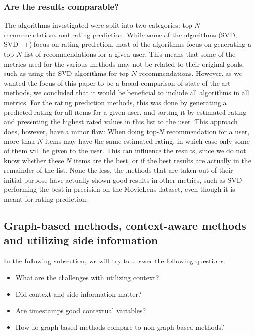 \subsubsection{Are the results comparable?}
The algorithms investigated were split into two categories: top-$N$ recommendations and rating prediction.
While some of the algorithms (SVD, SVD++) focus on rating prediction, most of the algorithms focus on generating a top-$N$ list of recommendations for a given user.
This means that some of the metrics used for the various methods may not be related to their original goals, such as using the SVD algorithms for top-$N$ recommendations.
However, as we wanted the focus of this paper to be a broad comparison of state-of-the-art methods, we concluded that it would be beneficial to include all algorithms in all metrics.
For the rating prediction methods, this was done by generating a predicted rating for all items for a given user, and sorting it by estimated rating and presenting the highest rated values in this list to the user.
This approach does, however, have a minor flaw: When doing top-$N$ recommendation for a user, more than $N$ items may have the same estimated rating, in which case only some of them will be given to the user.
This can influence the results, since we do not know whether these $N$ items are the best, or if the best results are actually in the remainder of the list.
None the less, the methods that are taken out of their initial purpose have actually shown good results in other metrics, such as SVD performing the best in precision on the MovieLens dataset, even though it is meant for rating prediction.

\subsection{Graph-based methods, context-aware methods and utilizing side information}
In the following subsection, we will try to answer the following questions: 
\begin{itemize}
    \item What are the challenges with utilizing context?
    \item Did context and side information matter?
    \item Are timestamps good contextual variables?
    \item How do graph-based methods compare to non-graph-based methods?
\end{itemize}

